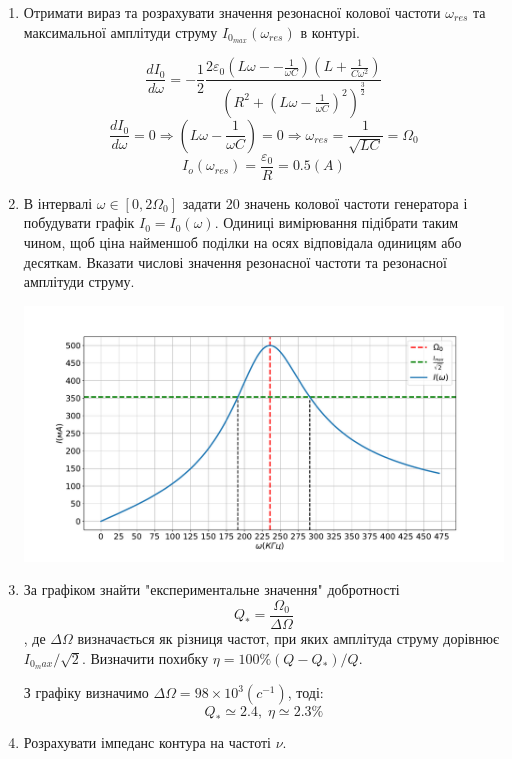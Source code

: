\documentclass[a4paper, 12pt]{article}
\begin{document}
\begin{enumerate}
    \item Отримати вираз та розрахувати значення резонасної колової частоти 
    $\omega_{res}$ та максимальної амплітуди струму $I_{0_{max}}(\omega_{res})$ в контурі.

    $$ \frac{dI_0}{d\omega} = 
    -\frac{1}{2} \frac{2 \varepsilon_0 \left( L \omega- - \frac{1}{\omega C} \right) \left( L + \frac{1}{C \omega^2} \right)}
    { \left(R^2 + \left( L \omega - \frac{1}{\omega C} \right)^2 \right)^{\frac{3}{2}} }$$
    $$ \frac{dI_0}{d\omega} = 0 \Rightarrow \left( L \omega - \frac{1}{\omega C} \right) = 0 \Rightarrow 
    \omega_{res} = \frac{1}{\sqrt{LC}} = \Omega_0 $$
    $$ I_o(\omega_{res}) = \frac{\varepsilon_0}{R} = 0.5 (A)$$

    \item В інтервалі $\omega \in \left[ 0,2\Omega_0 \right]$ задати 20
    значень колової частоти генератора і побудувати графік $I_0=I_0(\omega)$.
    Одиниці вимірювання підібрати таким чином, щоб ціна найменшоб поділки на осях
    відповідала одиницям або десяткам. Вказати числові значення резонасної частоти
    та резонасної амплітуди струму.
    
    \includegraphics[width=1.0\textwidth]{graphics/I(w).pdf}

    \item За графіком знайти "експериментальне значення" добротності
    $$Q_* = \frac{\Omega_0}{\Delta \Omega}$$,
    де $\Delta \Omega$ визначається як різниця частот, при яких амплітуда
    струму дорівнює $I_{0_max}/\sqrt{2}$. 
    Визначити похибку $\eta = 100\% \left( Q-Q_* \right) / Q$.
 
    З графіку визначимо $\Delta \Omega = 98 \times 10^3(c^{-1})$, тоді:
    $$ Q_* \simeq 2.4, \; \eta \simeq 2.3 \%$$

    \item Розрахувати імпеданс контура на частоті $\nu$.


\end{enumerate}
\end{document}
